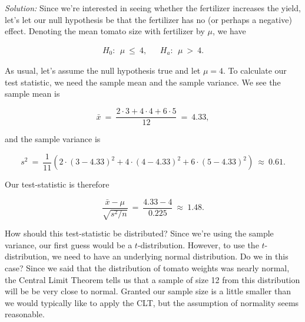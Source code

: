 \emph{Solution:} Since we're interested in seeing whether the fertilizer increases the yield, let's let our null hypothesis be that the fertilizer has no (or perhaps a negative) effect.  Denoting the mean tomato size with fertilizer by $\mu$, we have

\begin{eqnarray}

H_0: \ \ \mu\ \leq\ 4, \ \ \ \ \ \ \ H_a:\ \  \mu\ >\ 4.

\end{eqnarray}



As usual, let's assume the null hypothesis true and let $\mu = 4$. To calculate our test statistic, we need the sample mean and the sample variance.  We see the sample mean is

\begin{equation*}

\bar{x} \ = \  \frac{2\cdot3+4\cdot4+6\cdot5}{12}\ = \ 4.33,

\end{equation*}

and the sample variance is

\begin{equation*}

s^2 \ = \  \frac{1}{11}\left(2\cdot(3-4.33)^2+4\cdot(4-4.33)^2+6\cdot(5-4.33)^2\right)\ \approx \  0.61.

\end{equation*}

Our test-statistic is therefore

\begin{equation*}

\frac{\bar{x}-\mu}{\sqrt{s^2/n}} \ = \  \frac{4.33-4}{0.225} \ \approx \  1.48.

\end{equation*}



How should this test-statistic be distributed?  Since we're using the sample variance, our first guess would be a $t$-distribution.  However, to use the $t$-distribution, we need to have an underlying normal distribution.  Do we in this case?  Since we said  that the distribution of tomato weights was nearly normal, the Central Limit Theorem tells us that a sample of size 12 from this distribution will be be very close to normal.  Granted our sample size is a little smaller than we would typically like to apply the CLT, but the assumption of normality seems reasonable.



